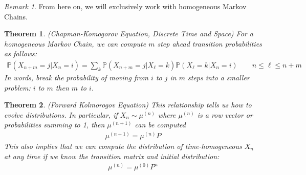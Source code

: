 \documentclass[12pt]{article}
\theoremstyle{plain}
\newtheorem{thm}{Theorem}[section]
\theoremstyle{definition}
\theoremstyle{remark}
\newtheorem*{rmk}{Remark}
\begin{document}
\begin{rmk}
From here on, we will exclusively work with homogeneous Markov Chains.
\end{rmk}

\begin{thm}{\emph{(Chapman-Komogorov Equation, Discrete Time and Space)}}
For a homogeneous Markov Chain, we can compute $m$ step ahead transition
probabilities as follows:
\begin{align*}
  \mathbb{P}(X_{n+m}=j | X_{n}=i) = \sum_k \mathbb{P}(X_{n+m}=j| X_\ell=k)
    \mathbb{P}(X_\ell = k| X_n=i)
  \qquad
  n \leq \ell \leq n+m
\end{align*}
In words, break the probability of moving from $i$ to $j$ in $m$ steps
into a smaller problem: $i$ to $m$ then $m$ to $i$.
\end{thm}

\begin{thm}{\emph{(Forward Kolmorogov Equation)}}
This relationship tells us how to evolve distributions. In particular,
if $X_n\sim \mu^{(n)}$ where $\mu^{(n)}$ is a row vector or
probabilities summing to 1, then $\mu^{(n+1)}$ can be computed
\begin{align*}
  \mu^{(n+1)} = \mu^{(n)} P
\end{align*}
This also implies that we can compute the distribution of
time-homogeneous $X_n$ at any time if we know the transition matrix and
initial distribution:
\begin{align*}
  \mu^{(n)} = \mu^{(0)} P^n
\end{align*}
\end{thm}
\end{document}
